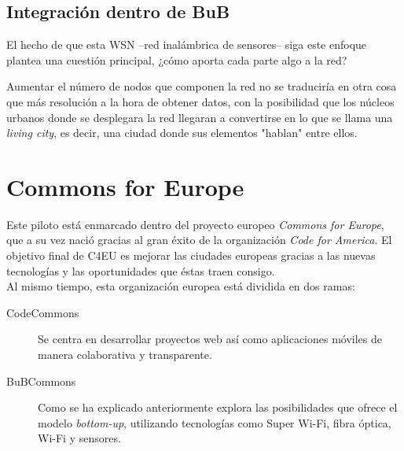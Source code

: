 \documentclass[a4paper]{article}
\begin{document}
\subsection{Integración dentro de BuB}
El hecho de que esta WSN --red inalámbrica de sensores-- siga este enfoque plantea una cuestión principal, ¿cómo aporta cada parte algo a la red?

Aumentar el número de nodos que componen la red no se traduciría en otra cosa que más resolución a la hora de obtener datos, con la posibilidad que los núcleos urbanos donde se desplegara la red llegaran a convertirse en lo que se llama una \emph{living city}, es decir, una ciudad donde sus elementos "hablan" entre ellos.


\section{Commons for Europe}
Este piloto está enmarcado dentro del proyecto europeo \emph{Commons for Europe}, que a su vez nació gracias al gran éxito de la organización \emph{Code for America}. El objetivo final de C4EU es mejorar las ciudades europeas gracias a las nuevas tecnologías y las oportunidades que éstas traen consigo.\\

Al mismo tiempo, esta organización europea está dividida en dos ramas:
\begin{description}
    \item[CodeCommons] Se centra en desarrollar proyectos web así como aplicaciones móviles de manera colaborativa y transparente.
    \item[BuBCommons] Como se ha explicado anteriormente explora las posibilidades que ofrece el modelo \emph{bottom-up}, utilizando tecnologías como Super Wi-Fi, fibra óptica, Wi-Fi y sensores.
\end{description}
\end{document}
